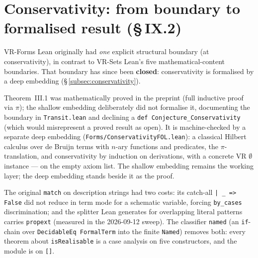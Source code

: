 \section{Conservativity: from boundary to formalised result (\S\,IX.2)}
\label{sec:forms_boundary}

VR-Forms Lean originally had \emph{one} explicit structural boundary (at conservativity),
in contrast to VR-Sets Lean's five mathematical-content boundaries.  That boundary has
since been \textbf{closed}: conservativity is formalised by a deep embedding
(\S\,\ref{subsec:conservativity}).

\begin{remark}
\label{rem:obs3_boundary}
\leanok
{}
Theorem~III.1 was mathematically proved in the preprint (full inductive proof via $\pi$);
the shallow embedding deliberately did not formalise it, documenting the boundary in
\texttt{Transit.lean} and declining a \texttt{def Conjecture\_Conservativity} (which would
misrepresent a proved result as open).  It is machine-checked by a separate deep
embedding (\texttt{Forms/ConservativityFOL.lean}): a classical Hilbert calculus over de
Bruijn terms with $n$-ary functions and predicates, the $\pi$-translation, and conservativity
by induction on derivations, with a concrete VR $\emptyset$ instance --- on the empty axiom
list.  The shallow embedding remains the working layer; the deep embedding stands beside it
as the proof.
\end{remark}

\begin{remark}
\label{rem:obs4_catchall}
\leanok
{}
The original \texttt{match} on description strings had two costs: its
catch-all \texttt{|\,\_ => False} did not reduce in term mode for a
schematic variable, forcing \texttt{by\_cases} discrimination; and the
splitter Lean generates for overlapping literal patterns carries
\texttt{propext} (measured in the 2026-09-12 sweep).  The classifier
\texttt{named} (an \texttt{if}-chain over \texttt{DecidableEq FormalTerm}
into the finite \texttt{Named}) removes both: every theorem about
\texttt{isRealisable} is a case analysis on five constructors, and the
module is on \texttt{[]}.
\end{remark}


